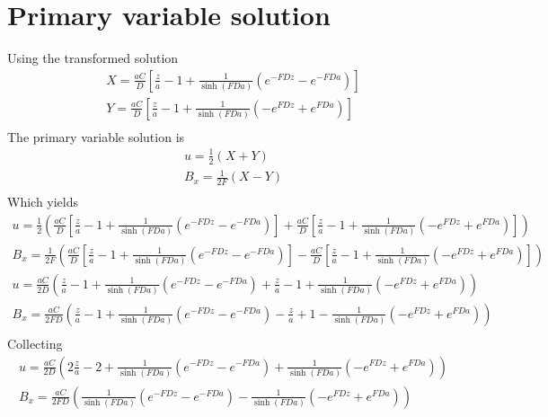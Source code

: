 \documentclass[11pt]{article}
\begin{document}
\section{Primary variable solution}
Using the transformed solution
\begin{equation}\begin{aligned}
	X = \frac{aC}{D} \left[ \frac{z}{a} - 1 + \frac{1}{\sinh(FD a)} \left(   e^{-FD z} - e^{-FD a} \right) \right] \\
	Y = \frac{aC}{D} \left[ \frac{z}{a} - 1 + \frac{1}{\sinh(FD a)} \left( - e^{ FD z} + e^{ FD a} \right) \right] \\
\end{aligned} \end{equation}
The primary variable solution is
\begin{equation}\begin{aligned}
u   = \frac{1}{2} \left( X + Y \right) \\
B_x = \frac{1}{2F} \left( X - Y \right) \\
\end{aligned} \end{equation}
Which yields
\begin{equation}\begin{aligned}
u   = \frac{1}{2}  \left( \frac{aC}{D} \left[ \frac{z}{a} - 1 + \frac{1}{\sinh(FD a)} \left(   e^{-FD z} - e^{-FD a} \right) \right] + \frac{aC}{D} \left[ \frac{z}{a} - 1 + \frac{1}{\sinh(FD a)} \left( - e^{ FD z} + e^{ FD a} \right) \right] \right) \\
B_x = \frac{1}{2F} \left( \frac{aC}{D} \left[ \frac{z}{a} - 1 + \frac{1}{\sinh(FD a)} \left(   e^{-FD z} - e^{-FD a} \right) \right] - \frac{aC}{D} \left[ \frac{z}{a} - 1 + \frac{1}{\sinh(FD a)} \left( - e^{ FD z} + e^{ FD a} \right) \right] \right) \\
u   = \frac{aC}{2D}  \left( \frac{z}{a} - 1 + \frac{1}{\sinh(FD a)} \left(   e^{-FD z} - e^{-FD a} \right) + \frac{z}{a} - 1 + \frac{1}{\sinh(FD a)} \left( - e^{ FD z} + e^{ FD a} \right) \right) \\
B_x = \frac{aC}{2FD} \left( \frac{z}{a} - 1 + \frac{1}{\sinh(FD a)} \left(   e^{-FD z} - e^{-FD a} \right) - \frac{z}{a} + 1 - \frac{1}{\sinh(FD a)} \left( - e^{ FD z} + e^{ FD a} \right) \right) \\
\end{aligned} \end{equation}
Collecting
\begin{equation}\begin{aligned}
u   = \frac{aC}{2D}  \left( 2\frac{z}{a} - 2 + \frac{1}{\sinh(FD a)} \left(   e^{-FD z} - e^{-FD a} \right) + \frac{1}{\sinh(FD a)} \left( - e^{ FD z} + e^{ FD a} \right) \right) \\
B_x = \frac{aC}{2FD} \left(\frac{1}{\sinh(FD a)} \left(   e^{-FD z} - e^{-FD a} \right) - \frac{1}{\sinh(FD a)} \left( - e^{ FD z} + e^{ FD a} \right) \right) \\
\end{aligned} \end{equation}
\end{document}
